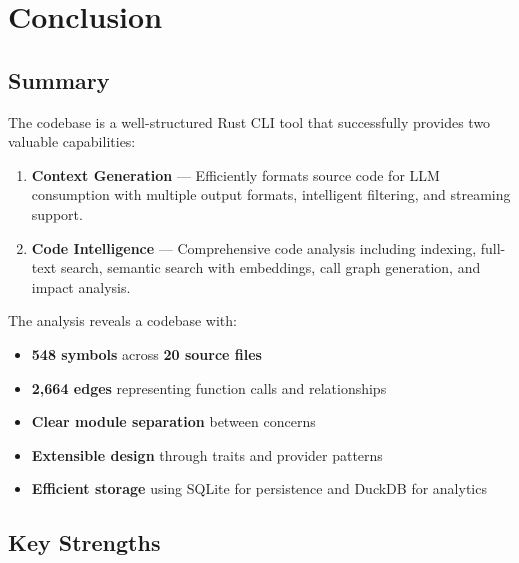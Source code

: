 
\section{Conclusion}
\label{sec:conclusion}

\subsection{Summary}

The \ctx{} codebase is a well-structured Rust CLI tool that successfully provides two valuable capabilities:

\begin{enumerate}
    \item \textbf{Context Generation} --- Efficiently formats source code for LLM consumption with multiple output formats, intelligent filtering, and streaming support.
    
    \item \textbf{Code Intelligence} --- Comprehensive code analysis including indexing, full-text search, semantic search with embeddings, call graph generation, and impact analysis.
\end{enumerate}

The analysis reveals a codebase with:
\begin{itemize}
    \item \textbf{548 symbols} across \textbf{20 source files}
    \item \textbf{2,664 edges} representing function calls and relationships
    \item \textbf{Clear module separation} between concerns
    \item \textbf{Extensible design} through traits and provider patterns
    \item \textbf{Efficient storage} using SQLite for persistence and DuckDB for analytics
\end{itemize}

\subsection{Key Strengths}

